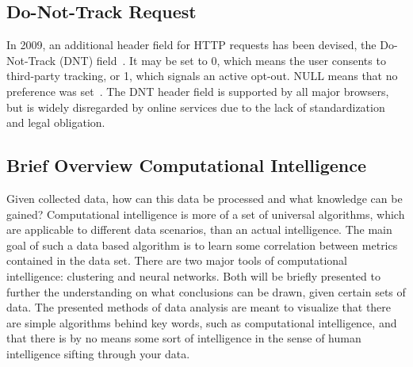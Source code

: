 \subsection{Do-Not-Track Request}
In 2009, an additional header field for HTTP requests has been devised, the Do-Not-Track (DNT) field~\cite{dnt-writeup}.
It may be set to 0, which means the user consents to third-party tracking, or 1, which signals an active opt-out.
NULL means that no preference was set~\cite{dnt-spec}.
The DNT header field is supported by all major browsers, but is widely disregarded by online services due to the lack of standardization and legal obligation.


\subsection{Brief Overview Computational Intelligence}
Given collected data, how can this data be processed and what knowledge can be gained?
Computational intelligence is more of a set of universal algorithms, which 
are applicable to different data scenarios, than an actual intelligence. 
The main goal of such a data based algorithm is to learn some correlation between metrics contained in the data set.         
There are two major tools of computational intelligence: clustering and neural networks. 
Both will be briefly presented to further the understanding on what conclusions
can be drawn, given certain sets of data. The presented methods of data analysis are meant to
visualize that there are simple algorithms behind key words, such as computational intelligence, 
and that there is by no means some sort of intelligence in the sense of human intelligence 
sifting through your data. 

